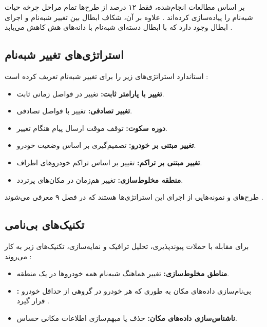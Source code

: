 \documentclass[12pt,a4paper]{article}
\begin{document}
بر اساس مطالعات انجام‌شده، فقط ۱۲ درصد از طرح‌ها تمام مراحل چرخه حیات شبه‌نام را پیاده‌سازی کرده‌اند \cite{rahmawatiagustinaSystematicLiteratureReview2025}. علاوه بر آن، شکاف ابطال بین تغییر شبه‌نام و اجرای ابطال وجود دارد که با ابطال دسته‌ای شبه‌نام با دانه‌های هش کاهش می‌یابد \cite{rahmawatiagustinaSystematicLiteratureReview2025}.

\subsection{استراتژی‌های تغییر شبه‌نام }

استاندارد  استراتژی‌های زیر را برای تغییر شبه‌نام تعریف کرده است \cite{rahmawatiagustinaSystematicLiteratureReview2025}:

\begin{itemize}
  \item \textbf{تغییر با پارامتر ثابت:} تغییر در فواصل زمانی ثابت.
  \item \textbf{تغییر تصادفی:} تغییر با فواصل تصادفی.
  \item \textbf{دوره سکوت:} توقف موقت ارسال پیام هنگام تغییر.
  \item \textbf{تغییر مبتنی بر خودرو:} تصمیم‌گیری بر اساس وضعیت خودرو.
  \item \textbf{تغییر مبتنی بر تراکم:} تغییر بر اساس تراکم خودروهای اطراف.
  \item \textbf{منطقه مخلوط‌سازی:} تغییر هم‌زمان در مکان‌های پرتردد.
\end{itemize}

طرح‌های  و  نمونه‌هایی از اجرای این استراتژی‌ها هستند که در فصل ۹ معرفی می‌شوند \cite{luPseudonymChangingSocial2012, al-aniPrivacySafetyImprovement2023}.

\subsection{تکنیک‌های بی‌نامی}

برای مقابله با حملات پیوندپذیری، تحلیل ترافیک و نمایه‌سازی، تکنیک‌های زیر به کار می‌روند \cite{rahmawatiagustinaSystematicLiteratureReview2025}:

\begin{itemize}
  \item \textbf{مناطق مخلوط‌سازی:} تغییر هماهنگ شبه‌نام همه خودروها در یک منطقه.
  \item \textbf{:} بی‌نام‌سازی داده‌های مکان به طوری که هر خودرو در گروهی از حداقل  خودرو قرار گیرد \cite{zhangRAISEEfficientRSUAided2008}.
  \item \textbf{ناشناس‌سازی داده‌های مکان:} حذف یا مبهم‌سازی اطلاعات مکانی حساس.
\end{itemize}
\end{document}
